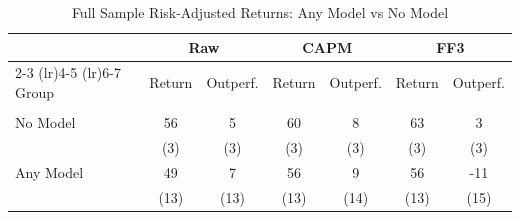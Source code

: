 \begin{table}[htbp]
\centering
\small
\caption{Full Sample Risk-Adjusted Returns: Any Model vs No Model}
\label{tab:risk_adjusted_fs_anymodel}
\setlength{\tabcolsep}{2ex}
\begin{tabular}{lcccccc}
\toprule
  & \multicolumn{2}{c}{Raw} & \multicolumn{2}{c}{CAPM} & \multicolumn{2}{c}{FF3}
\\
\cmidrule(lr){2-3} \cmidrule(lr){4-5} \cmidrule(lr){6-7}
Group & Return & Outperf. & Return & Outperf. & Return & Outperf.
\\
\midrule
\multicolumn{7}{l}{\textbf{}}\\
\addlinespace[2pt]
No Model & 56 & 5 & 60 & 8 & 63 & 3
\\
 & (3) & (3) & (3) & (3) & (3) & (3)
\\[2pt]
Any Model & 49 & 7 & 56 & 9 & 56 & -11
\\
 & (13) & (13) & (13) & (14) & (13) & (15)
\\[2pt]
\bottomrule
\end{tabular}
\end{table}
